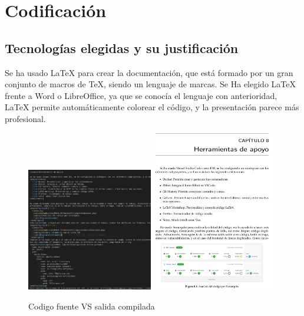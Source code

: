 \documentclass[11pt,spanish,listoffigures,listoftables]{tfgetsinf}
\begin{document}
\chapter{Codificación}

\section{Tecnologías elegidas y su justificación}

Se ha usado \LaTeX{} para crear la documentación, que está formado por un gran conjunto de macros de TeX, siendo un lenguaje de marcas. 
Se Ha elegido \LaTeX{} frente a Word o LibreOffice, ya que se conocía el lenguaje con anterioridad, \LaTeX{} permite automáticamente colorear el código, y la presentación parece más profesional.

\begin{figure}[ht!] %
  \includegraphics[width=0.49\textwidth]{img/LatexCode.png}
  \includegraphics[width=0.49\textwidth]{img/LatexCompilado.png}
  \caption{Codigo fuente VS salida compilada}
  \label{fig:Latex}
\end{figure}
\end{document}
